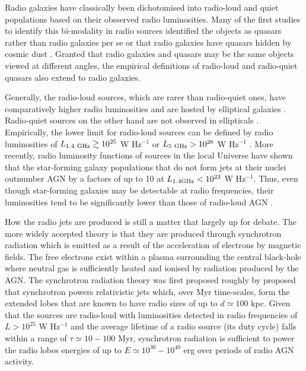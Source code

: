 \documentclass[10pt,a4paper]{article}
\begin{document}
Radio galaxies have classically been dichotomised into radio-loud and quiet populations based on their obsserved radio luminosities. Many of the first studies to identify this bi-modality in radio sources identified the objects as quasars rather than radio galaxies per se or that radio galaxies have quasars hidden by cosmic dust \citep{Vernet2001}. Granted that radio galaxies and quasars may be the same objects viewed at different angles, the empirical definitions of radio-loud and radio-quiet quasars also extend to radio galaxies. 

Generally, the radio-loud sources, which are rarer than radio-quiet ones, have comparatively higher radio luminosities and are hosted by elliptical galaxies \citep{Padovani1993}. Radio-quiet sources on the other hand are not observed in ellipticals \citep{Wilson1995}. Empirically, the lower limit for radio-loud sources can be defined by radio luminosities of $L_{1.4~\rm GHz} \gtrsim 10^{25}$ W Hz$^{-1}$ or $L_{5~\rm GHz} > 10^{26}$ W Hz$^{-1}$ \citep{Miller1990}. More recently, radio luminosity functions of sources in the local Universe have shown that the star-forming galaxy populations that do not form jets at their nuclei outnumber AGN by a factors of up to 10 at $L_{1.4 \rm GHz} < 10^{23}$ W Hz$^{-1}.$ Thus, even though star-forming galaxies may be detectable at radio frequencies, their luminosities tend to be significantly lower than those of radio-loud AGN \citep{Best2005a}. 

How the radio jets are produced is still a matter that largely up for debate. The more widely accepted theory is that they are produced through synchrotron radiation which is emitted as a result of the acceleration of electrons by magnetic fields. The free electrons exist within a plasma surrounding the central black-hole where neutral gas is sufficiently heated and ionised by radiation produced by the AGN. The synchrotron radiation theory was first proposed roughly by \citet{Shklovskii1953} proposed that synchrotron powers relativistic jets which, over Myr time-scales, form the extended lobes that are known to have radio sizes of up to $d\simeq100$ kpc. Given that the sources are radio-loud with luminosities detected in radio frequencies of $L > 10^{25}$ W Hz$^{-1}$ and the average lifetime of a radio source (its duty cycle) falls within a range of $\tau\simeq10-100$ Myr, synchrotron radiation is sufficient to power the radio lobes energies of up to $E \simeq 10^{30} - 10^{40}$ erg over periods of radio AGN activity.
\end{document}

